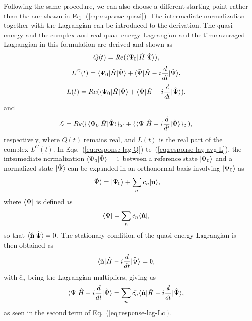 Following the same procedure, we can also choose a different starting point rather than the one shown in Eq.~(\ref{eq:response-quasi}). The intermediate normalization together with the Lagrangian can be introduced to the derivation. The quasi-energy and the complex and real quasi-energy Lagrangian and the time-averaged Lagrangian in this formulation are derived and shown as
\begin{equation}
Q(t)  = Re(\langle\Psi_{0} |\hat{H}| \hat{\Psi} \rangle),
\label{eq:response-lag-Q}
\end{equation}
\begin{equation}
L^{C}(t)  = \langle\Psi_{0} |\hat{H}| \hat{\Psi} \rangle + \langle\bar{\Psi} |\hat{H} - i\frac{d}{dt}| \hat{\Psi} \rangle,
\label{eq:response-lag-Lc}
\end{equation}
\begin{equation}
L(t)  = Re(\langle\Psi_{0} |\hat{H}| \hat{\Psi} \rangle + \langle\bar{\Psi} |\hat{H} - i\frac{d}{dt}| \hat{\Psi} \rangle),
\label{eq:response-lag-L}
\end{equation}
and
\begin{equation}
\mathcal{L}  = Re(\{\langle\Psi_{0} |\hat{H}| \hat{\Psi} \rangle\}_{T} + \{\langle\bar{\Psi} |\hat{H} - i\frac{d}{dt}| \hat{\Psi} \rangle\}_{T}),
\label{eq:response-lag-avg-L}
\end{equation}
respectively, where $Q(t)$ remains real, and $L(t)$ is the real part of the complex $L^{C}(t)$. In Eqs.~(\ref{eq:response-lag-Q}) to~(\ref{eq:response-lag-avg-L}), the intermediate normalization $\langle\Psi_{0} |\hat{\Psi}\rangle=1$ between a reference state $| \Psi_{0} \rangle$ and a normalized state $| \hat{\Psi} \rangle$ can be expanded in an orthonormal basis involving $| \Psi_{0} \rangle$ as
\begin{equation}
| \hat{\Psi} \rangle = | \Psi_{0} \rangle + \sum_{n}c_{n}| \textbf{n} \rangle,
\label{eq:response-c}
\end{equation}
where $\langle\bar{\Psi} |$ is defined as 
\begin{equation}
\langle\bar{\Psi} |=\sum_{n}\bar{c}_{n}\langle\hat{\textbf{n}} |,
\label{eq:response-cbar}
\end{equation}
so that $\langle\hat{\textbf{n}} |\hat{\Psi}\rangle=0$. The stationary condition of the quasi-energy Lagrangian is then obtained as
\begin{equation}
\langle\hat{\textbf{n}} |\hat{H}-i\frac{d}{dt}| \hat{\Psi} \rangle=0,
\end{equation}
with $\bar{c}_{n}$ being the Lagrangian multipliers, giving us 
\begin{equation}
\langle\bar{\Psi} |\hat{H} - i\frac{d}{dt}| \hat{\Psi} \rangle = \sum_{n}\bar{c_{n}}\langle\hat{\textbf{n}} |\hat{H}-i\frac{d}{dt}| \hat{\Psi} \rangle,
\end{equation}
as seen in the second term of Eq.~(\ref{eq:response-lag-Lc}).

